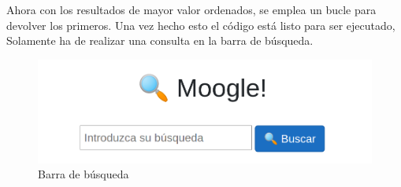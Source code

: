 \documentclass{article}
\begin{document}
Ahora con los resultados de mayor valor ordenados, se emplea un bucle para devolver los primeros. Una vez hecho esto el código está listo para ser ejecutado, Solamente ha de realizar una consulta en la barra de búsqueda.


\begin{figure}
        \includegraphics[width = 10 cm ]{./moogle.png}
    \caption[short]{Barra de búsqueda}
    
    \end{figure}
\end{document}
